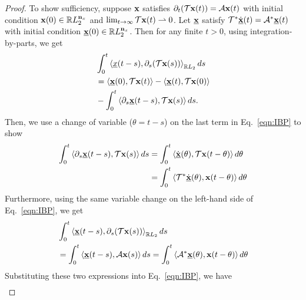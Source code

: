 \begin{proof}
    To show sufficiency, suppose $\mathbf{x}$ satisfies $\partial_t(\mathcal{T}\mathbf{x}(t)) = \mathcal{A}\mathbf{x}(t)$ with initial condition $\mathbf{x}(0)\in \mathbb{R} L_2^{\mathbf{n}_x}$ and $\lim_{t\to\infty} \mathcal{T}\mathbf{x}(t) \rightharpoonup 0$. Let $\underline{\mathbf{x}}$ satisfy $\mathcal{T}^*\dot{\underline{\mathbf{x}}}(t) = \mathcal{A}^*\underline{\mathbf{x}}(t)$ with initial condition $\underline{\mathbf{x}}(0)\in \mathbb{R} L_2^{\mathbf{n}_x}$. Then for any finite $t>0$, using integration-by-parts, we get
    \begin{equation}\label{eqn:IBP}
        \begin{aligned}
            &\int_0^t \left\langle \underline{x}(t-s), \partial_s(\mathcal{T}\mathbf{x}(s)) \right\rangle_{\mathbb{R} L_2} ds\\
            &= \left\langle \underline{\mathbf{x}}(0), \mathcal{T}\mathbf{x}(t) \right\rangle - \left\langle \underline{\mathbf{x}}(t), \mathcal{T}\mathbf{x}(0) \right\rangle\\
            &-\int_0^t\left\langle \partial_s\underline{\mathbf{x}}(t-s), \mathcal{T}\mathbf{x}(s) \right\rangle ds.
        \end{aligned}
    \end{equation}
    Then, we use a change of variable ($\theta = t-s$) on the last term in Eq.~\eqref{eqn:IBP} to show
    \begin{equation*}
        \begin{aligned}
        \int_0^t\left\langle \partial_s\underline{\mathbf{x}}(t-s), \mathcal{T}\mathbf{x}(s) \right\rangle ds &= \int_0^t \left\langle \dot{\underline{\mathbf{x}}}(\theta), \mathcal{T}\mathbf{x}(t-\theta) \right\rangle d\theta\\
        &=\int_0^t\left\langle \mathcal{T}^*\dot{\underline{\mathbf{x}}}(\theta), \mathbf{x}(t-\theta) \right\rangle d\theta
        \end{aligned}
    \end{equation*}
    Furthermore, using the same variable change on the left-hand side of Eq.~\eqref{eqn:IBP}, we get
    \begin{equation*}
        \begin{aligned}
             &\int_0^t\left\langle \underline{\mathbf{x}}(t-s), \partial_s(\mathcal{T}\mathbf{x}(s)) \right\rangle_{\mathbb{R} L_2} ds\\ 
             &= \int_0^t \left\langle \underline{\mathbf{x}}(t-s), \mathcal{A}\mathbf{x}(s) \right\rangle ds         =\int_0^t\left\langle \mathcal{A}^*\underline{\mathbf{x}}(\theta), \mathbf{x}(t-\theta) \right\rangle d\theta
        \end{aligned}
    \end{equation*}
    Substituting these two expressions into Eq.~\eqref{eqn:IBP}, we have
    \begin{equation*}
        \begin{aligned}

\end{aligned}
\end{equation*}
\end{proof}
